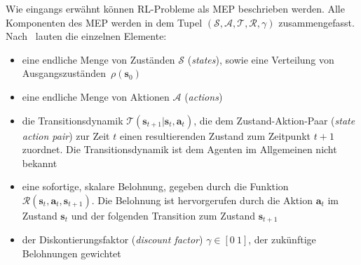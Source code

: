 Wie eingangs erwähnt können RL-Probleme als MEP beschrieben werden. Alle Komponenten des MEP werden in dem Tupel 
$(\mathcal{S}, \mathcal{A}, \mathcal{T}, \mathcal{R}, \gamma)$
zusammengefasst. Nach~\cite{ADBB17} lauten die einzelnen Elemente:
\begin{itemize}
\item eine endliche Menge von Zuständen $\mathcal{S}$ (\textit{states}), sowie eine Verteilung von Ausgangszuständen~$\rho(\bm{s}_0)$
\item eine endliche Menge von Aktionen $\mathcal{A}$ (\textit{actions})
\item die Transitionsdynamik $\mathcal{T}( \bm{s}_{t+1} | \bm{s}_t, \bm{a}_t)$, die dem Zustand-Aktion-Paar (\textit{state action pair}) zur Zeit $t$ einen resultierenden Zustand zum Zeitpunkt $t+1$ zuordnet. Die Transitionsdynamik ist dem Agenten im Allgemeinen nicht bekannt
\item eine sofortige, skalare Belohnung, gegeben durch die Funktion $\mathcal{R}(\bm{s}_t, \bm{a}_t, \bm{s}_{t+1})$. Die Belohnung ist hervorgerufen durch die Aktion $\bm{a}_t$ im Zustand $\bm{s}_t$ und der folgenden Transition zum Zustand $\bm{s}_{t+1}$
\item der Diskontierungsfaktor (\textit{discount factor}) $\gamma \in [0~1]$, der zukünftige Belohnungen gewichtet
\end{itemize}




